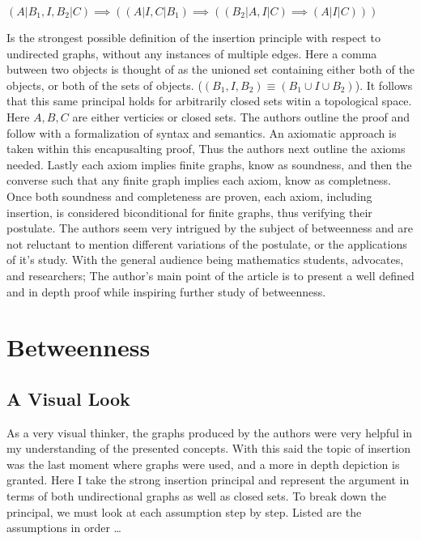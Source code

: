 \documentclass[a4paper,man,natbib]{apa6}
\begin{document}
\begin{center}

      $ (A | B_1 , I , B_2 | C) \implies ((A | I , C | B_1) \implies ((B_2 | A , I | C) \implies (A | I | C ))) $ 

\end{center}

\noindent
Is the strongest possible definition of the insertion principle with respect to undirected graphs, without any instances of multiple edges. 
Here a comma butween two objects is thought of as the unioned set containing either both of the objects, or both of the sets of objects. ($ (B_1 , I , B_2) \equiv (B_1 \cup I \cup B_2) $). 
It follows that this same principal holds for arbitrarily closed sets witin a topological space. 
Here $ A , B , C $ are either verticies or closed sets. The authors outline the proof and follow with a formalization of syntax and semantics. 
An axiomatic approach is taken within this encapusalting proof, Thus the authors next outline the axioms needed. 
Lastly each axiom implies finite graphs, know as soundness, and then the converse such that any finite graph implies each axiom, know as completness. 
Once both soundness and completeness are proven, each axiom, including insertion, is considered biconditional for finite graphs, thus verifying their postulate.  
The authors seem very intrigued by the subject of betweenness and are not reluctant to mention different variations of the postulate, or the applications of it's study. 
With the general audience being mathematics students, advocates, and researchers; 
The author's main point of the article is to present a well defined and in depth proof while inspiring further study of betweenness.


\section{Betweenness}
\label{sec:Graphs and Points}

\subsection{A Visual Look}
As a very visual thinker, the graphs produced by the authors were very helpful in my understanding of the presented concepts.
With this said the topic of insertion was the last moment where graphs were used, and a more in depth depiction is granted. 
Here I take the strong insertion principal and represent the argument in terms of both undirectional graphs as well as closed sets. 
To break down the principal, we must look at each assumption step by step. Listed are the assumptions in order \dots
\end{document}
